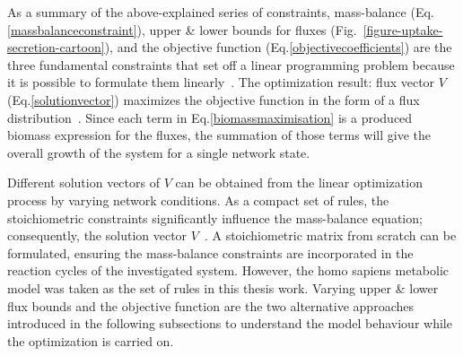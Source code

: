 

As a summary of the above-explained series of constraints, mass-balance (Eq.\eqref{massbalanceconstraint}), upper \& lower bounds for fluxes (Fig.~\ref{figure-uptake-secretion-cartoon}), and the objective function (Eq.\eqref{objectivecoefficients}) are the three fundamental constraints that set off a linear programming problem because it is possible to formulate them linearly~\cite{PRICE2004}. The optimization result: flux vector $V$ (Eq.\eqref{solutionvector}) maximizes the objective function in the form of a flux distribution~\cite{KAUFFMAN2003491,PRICE2004}. Since each term in Eq.\eqref{biomassmaximisation} is a produced biomass expression for the fluxes, the summation of those terms will give the overall growth of the system for a single network state.

Different solution vectors of $V$ can be obtained from the linear optimization process by varying network conditions. As a compact set of rules, the stoichiometric constraints significantly influence the mass-balance equation; consequently, the solution vector $V$~\cite{Edwards2001}. A stoichiometric matrix from scratch can be formulated, ensuring the mass-balance constraints are incorporated in the reaction cycles of the investigated system. However, the homo sapiens metabolic model was taken as the set of rules in this thesis work. Varying upper \& lower flux bounds and the objective function are the two alternative approaches introduced in the following subsections to understand the model behaviour while the optimization is carried on.
